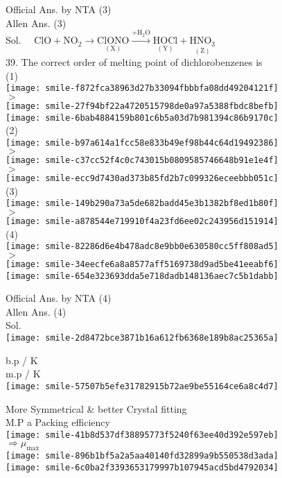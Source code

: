 \documentclass[10pt]{article}
\begin{document}
Official Ans. by NTA (3)\\
Allen Ans. (3)\\
Sol. \(\quad \mathrm{ClO}+\mathrm{NO}_{2} \longrightarrow \underset{(\mathrm{X})}{\mathrm{ClONO}} \xrightarrow{+\mathrm{H}_{2} \mathrm{O}} \underset{(\mathrm{Y})}{\mathrm{HOCl}}+\underset{(\mathrm{Z})}{\mathrm{HNO}_{3}}\)\\
39. The correct order of melting point of dichlorobenzenes is\\
(1)\\
\texttt{[image: smile-f872fca38963d27b33094fbbbfa08dd49204121f]}\\
\(>\)\\
\texttt{[image: smile-27f94bf22a4720515798de0a97a5388fbdc8befb]}\\
\texttt{[image: smile-6bab4884159b801c6b5a03d7b981394c86b9170c]}\\
(2)\\
\texttt{[image: smile-b97a614a1fcc58e833b49ef98b44c64d19492386]}\\
\(>\)\\
\texttt{[image: smile-c37cc52f4c0c743015b0809585746648b91e1e4f]}\\
\(>\)\\
\texttt{[image: smile-ecc9d7430ad373b85fd2b7c099326eceebbb051c]}\\
(3)\\
\texttt{[image: smile-149b290a73a5de682badd45e3b1382bf8ed1b80f]}\\
\(>\)\\
\texttt{[image: smile-a878544e719910f4a23fd6ee02c243956d151914]}\\
(4)\\
\texttt{[image: smile-82286d6e4b478adc8e9bb0e630580cc5ff808ad5]}\\
\(>\)\\
\texttt{[image: smile-34eecfe6a8a8577aff5169738d9ad5be41eeabf6]}\\
\texttt{[image: smile-654e323693dda5e718dadb148136aec7c5b1dabb]}

Official Ans. by NTA (4)\\
Allen Ans. (4)\\
Sol.\\
\texttt{[image: smile-2d8472bce3871b16a612fb6368e189b8ac25365a]}

b.p / K\\
m.p / K\\
\texttt{[image: smile-57507b5efe31782915b72ae9be55164ce6a8c4d7]}

More Symmetrical \& better Crystal fitting\\
M.P a Packing efficiency\\
\texttt{[image: smile-41b8d537df38895773f5240f63ee40d392e597eb]}\\
\(\Rightarrow \mu_{\text {max }}\)\\
\texttt{[image: smile-896b1bf5a2a5aa40140fd32899a9b550538d3ada]}\\
\texttt{[image: smile-6c0ba2f3393653179997b107945acd5bd4792034]}
\end{document}
